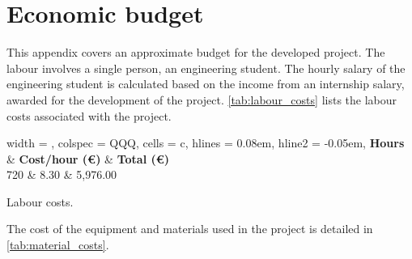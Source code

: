 \chapter{Economic budget}

This appendix covers an approximate budget for the developed project. The labour involves a single person, an engineering student. The hourly salary of the engineering student is calculated based on the income from an internship salary, awarded for the development of the project. \cref{tab:labour_costs} lists the labour costs associated with the project.

\begin{table}[h]
	\centering
	\begin{tblr}{
			width = \linewidth,
			colspec = {QQQ},
			cells = {c},
			hlines = {0.08em},
			hline{2} = {-}{0.05em},
		}
		\textbf{Hours} & \textbf{Cost/hour (€)} & \textbf{Total (€)}\\
		720 & 8.30 & 5,976.00
	\end{tblr}
	\caption{Labour costs.}
	\label{tab:labour_costs}
\end{table}

The cost of the equipment and materials used in the project is detailed in \cref{tab:material_costs}.

